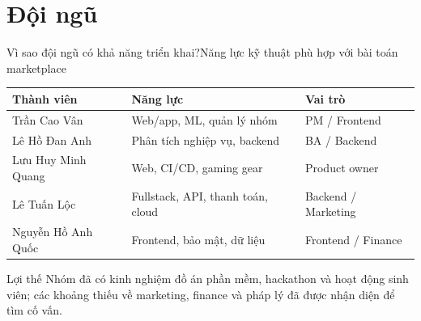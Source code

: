 \section{Đội ngũ}

\begin{frame}{Vì sao đội ngũ có khả năng triển khai?}{Năng lực kỹ thuật phù hợp với bài toán marketplace}
  \small
  \begin{tabularx}{.92\textwidth}{@{}lXl@{}}
    \toprule
    \textbf{Thành viên} & \textbf{Năng lực} & \textbf{Vai trò} \\
    \midrule
    Trần Cao Vân & Web/app, ML, quản lý nhóm & PM / Frontend \\
    Lê Hồ Đan Anh & Phân tích nghiệp vụ, backend & BA / Backend \\
    Lưu Huy Minh Quang & Web, CI/CD, gaming gear & Product owner \\
    Lê Tuấn Lộc & Fullstack, API, thanh toán, cloud & Backend / Marketing \\
    Nguyễn Hồ Anh Quốc & Frontend, bảo mật, dữ liệu & Frontend / Finance \\
    \bottomrule
  \end{tabularx}
  \vfill
  \begin{block}{Lợi thế}
    Nhóm đã có kinh nghiệm đồ án phần mềm, hackathon và hoạt động sinh viên; các khoảng thiếu về marketing, finance và pháp lý đã được nhận diện để tìm cố vấn.
  \end{block}
\end{frame}
